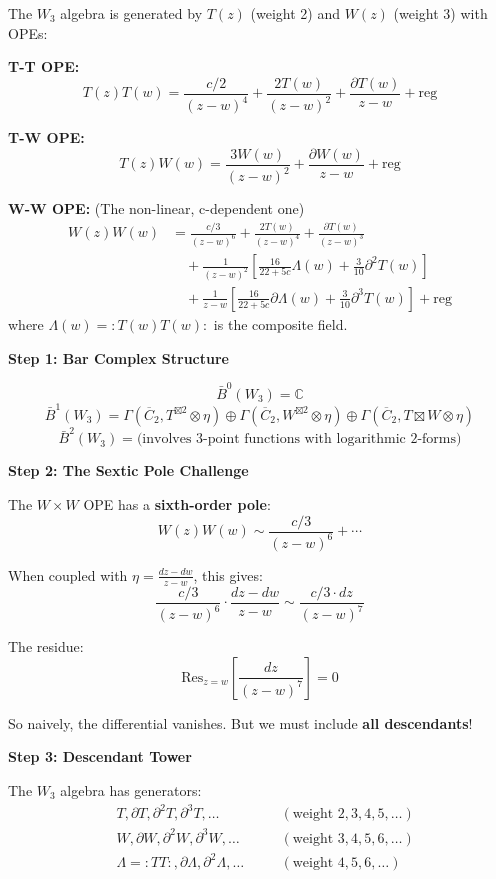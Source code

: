 \begin{example}
\label{ex:w3-completion-full}

The $W_3$ algebra is generated by $T(z)$ (weight 2) and $W(z)$ (weight 3) with OPEs:

\textbf{T-T OPE:}
$$T(z)T(w) = \frac{c/2}{(z-w)^4} + \frac{2T(w)}{(z-w)^2} + \frac{\partial T(w)}{z-w} + \text{reg}$$

\textbf{T-W OPE:}
$$T(z)W(w) = \frac{3W(w)}{(z-w)^2} + \frac{\partial W(w)}{z-w} + \text{reg}$$

\textbf{W-W OPE:} (The non-linear, c-dependent one)
\begin{align*}
W(z)W(w) &= \frac{c/3}{(z-w)^6} + \frac{2T(w)}{(z-w)^4} + \frac{\partial T(w)}{(z-w)^3} \\
&\quad + \frac{1}{(z-w)^2}\left[\frac{16}{22+5c} \Lambda(w) + \frac{3}{10}\partial^2 T(w)\right] \\
&\quad + \frac{1}{z-w}\left[\frac{16}{22+5c}\partial\Lambda(w) + \frac{3}{10}\partial^3 T(w)\right] + \text{reg}
\end{align*}
where $\Lambda(w) = :T(w)T(w):$ is the composite field.

\medskip
\noindent\textbf{Step 1: Bar Complex Structure}

$$\bar{B}^0(W_3) = \mathbb{C}$$
$$\bar{B}^1(W_3) = \Gamma(\overline{C}_2, T^{\boxtimes 2} \otimes \eta) \oplus \Gamma(\overline{C}_2, W^{\boxtimes 2} \otimes \eta) \oplus \Gamma(\overline{C}_2, T \boxtimes W \otimes \eta)$$
$$\bar{B}^2(W_3) = \text{(involves 3-point functions with logarithmic 2-forms)}$$

\medskip
\noindent\textbf{Step 2: The Sextic Pole Challenge}

The $W \times W$ OPE has a \textbf{sixth-order pole}:
$$W(z)W(w) \sim \frac{c/3}{(z-w)^6} + \cdots$$

When coupled with $\eta = \frac{dz-dw}{z-w}$, this gives:
$$\frac{c/3}{(z-w)^6} \cdot \frac{dz-dw}{z-w} \sim \frac{c/3 \cdot dz}{(z-w)^7}$$

The residue:
$$\text{Res}_{z=w}\left[\frac{dz}{(z-w)^7}\right] = 0$$

So naively, the differential vanishes. But we must include \textbf{all descendants}!

\medskip
\noindent\textbf{Step 3: Descendant Tower}

The $W_3$ algebra has generators:
\begin{align*}
&T, \partial T, \partial^2 T, \partial^3 T, \ldots \quad &&(\text{weight } 2, 3, 4, 5, \ldots) \\
&W, \partial W, \partial^2 W, \partial^3 W, \ldots \quad &&(\text{weight } 3, 4, 5, 6, \ldots) \\
&\Lambda = :TT:, \partial\Lambda, \partial^2\Lambda, \ldots \quad &&(\text{weight } 4, 5, 6, \ldots)
\end{align*}


\end{example}
